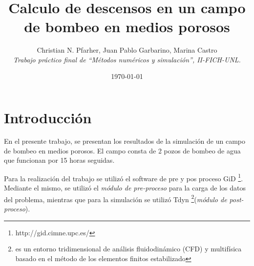\documentclass[10pt,a4paper,final]{article}
\begin{document}
\title{Calculo de descensos en un campo de bombeo en medios porosos}
\author{Christian N. Pfarher, Juan Pablo Garbarino, Marina Castro\\
\textit{Trabajo práctico final de ``Métodos numéricos y simulación'', II-FICH-UNL.}}
\date{\today}
\maketitle
\newpage
\tableofcontents
\newpage
\section{Introducción}
En el presente trabajo, se presentan los resultados de la simulación de un campo de bombeo en medios porosos. El campo
consta de 2 pozos de bombeo de agua que funcionan por 15 horas seguidas. 

Para la realización del trabajo se utilizó el software de pre y pos proceso GiD \footnote{http://gid.cimne.upc.es/}. Mediante el mismo, se utilizó el \emph{módulo de pre-proceso} para la carga de los datos del problema, mientras que para
la simulación se utilizó Tdyn \footnote{es un entorno tridimensional de análisis fluidodinámico (CFD) y multifísica basado en el método de los elementos finitos estabilizado}(\emph{módulo de post-proceso}).
\end{document}
